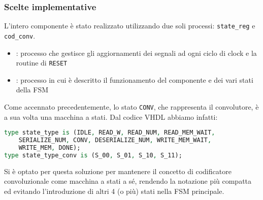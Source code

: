 \documentclass{article}
\begin{document}
\subsubsection{Scelte implementative}
L'intero componente è stato realizzato utilizzando due soli processi: \verb^state_reg^ e \verb^cod_conv^.
\begin{itemize}
    \item[\verb^state\_reg^]: processo che gestisce gli aggiornamenti dei segnali ad ogni ciclo di clock e la routine di \verb^RESET^
    \item[\verb^cod\_conv^]: processo in cui è descritto il funzionamento del componente e dei vari stati della FSM
\end{itemize}
Come accennato precedentemente, lo stato \verb^CONV^, che rappresenta il convolutore, è a sua volta una macchina a stati. Dal codice VHDL abbiamo infatti:
\begin{lstlisting}[language=VHDL]
type state_type is (IDLE, READ_W, READ_NUM, READ_MEM_WAIT, 
    SERIALIZE_NUM, CONV, DESERIALIZE_NUM, WRITE_MEM_WAIT, 
    WRITE_MEM, DONE);
type state_type_conv is (S_00, S_01, S_10, S_11);
\end{lstlisting}
Si è optato per questa soluzione per mantenere il concetto di codificatore convoluzionale come macchina a stati a sé, rendendo la notazione più compatta ed evitando l'introduzione di altri 4 (o più) stati nella FSM principale.
\end{document}
